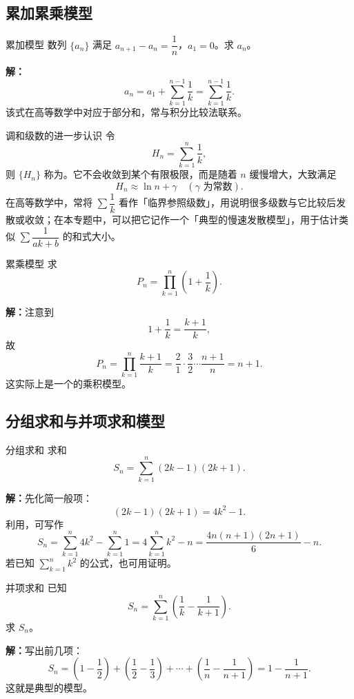 \documentclass[a4paper,11pt]{ctexart}
\begin{document}
\subsection{累加累乘模型}

\begin{examplebox}{累加模型}
  数列 $\{a_n\}$ 满足 $a_{n+1}-a_n=\dfrac{1}{n}$，$a_1=0$。求 $a_n$。

  \textbf{解：}
  \[
    a_n = a_1+\sum_{k=1}^{n-1}\frac{1}{k} = \sum_{k=1}^{n-1}\frac{1}{k}.
  \]
  该式在高等数学中对应于部分和，常与积分比较法联系。
\end{examplebox}

\begin{sideinfobox}{调和级数的进一步认识}
  令
  \[
    H_n=\sum_{k=1}^{n}\frac{1}{k},
  \]
  则 $\{H_n\}$ 称为。它不会收敛到某个有限极限，而是随着 $n$ 缓慢增大，大致满足
  \[
    H_n\approx\ln n+\gamma\quad(\gamma\text{ 为常数}).
  \]
  在高等数学中，常将 $\sum\dfrac{1}{k}$ 看作「临界参照级数」，用说明很多级数与它比较后发散或收敛；在本专题中，可以把它记作一个「典型的慢速发散模型」，用于估计类似 $\sum\dfrac{1}{ak+b}$ 的和式大小。
\end{sideinfobox}

\begin{examplebox}{累乘模型}
  求
  \[
    P_n=\prod_{k=1}^{n}\left(1+\frac{1}{k}\right).
  \]

  \textbf{解：}注意到
  \[
    1+\frac{1}{k}=\frac{k+1}{k},
  \]
  故
  \[
    P_n=\prod_{k=1}^{n}\frac{k+1}{k}=\frac{2}{1}\cdot\frac{3}{2}\cdots\frac{n+1}{n}=n+1.
  \]
  这实际上是一个的乘积模型。
\end{examplebox}

\subsection{分组求和与并项求和模型}

\begin{examplebox}{分组求和}
  求和
  \[
    S_n = \sum_{k=1}^{n}(2k-1)(2k+1).
  \]

  \textbf{解：}先化简一般项：
  \[
    (2k-1)(2k+1)=4k^2-1.
  \]
  利用，可写作
  \[
    S_n=\sum_{k=1}^n4k^2-\sum_{k=1}^n1
    =4\sum_{k=1}^n k^2-n
    =\frac{4n(n+1)(2n+1)}{6}-n.
  \]
  若已知 $\displaystyle\sum_{k=1}^n k^2$ 的公式，也可用证明。
\end{examplebox}

\begin{examplebox}{并项求和}
  已知
  \[
    S_n=\sum_{k=1}^n\left(\frac{1}{k}-\frac{1}{k+1}\right).
  \]
  求 $S_n$。

  \textbf{解：}写出前几项：
  \[
    S_n=\left(1-\frac{1}{2}\right)+\left(\frac{1}{2}-\frac{1}{3}\right)+\cdots+\left(\frac{1}{n}-\frac{1}{n+1}\right)
    =1-\frac{1}{n+1}.
  \]
  这就是典型的模型。
\end{examplebox}
\end{document}
